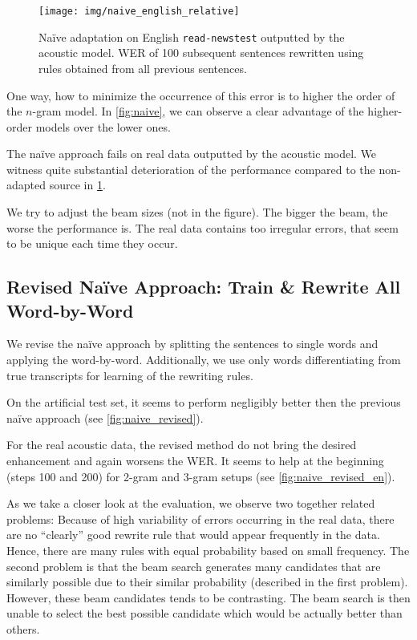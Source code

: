 \begin{figure}[h]
	\texttt{[image: img/naive\_english\_relative]}
	\caption{Na\"ive adaptation on English \texttt{read-newstest} outputted by the acoustic model. WER of 100 subsequent sentences rewritten using rules obtained from all previous sentences.}
	\label{fig:naive_en} 
\end{figure}

One way, how to minimize the occurrence of this error is to higher the order of the $n$-gram model. In \cref{fig:naive}, we can observe a clear advantage of the higher-order models over the lower ones.

The na\"ive approach fails on real data outputted by the acoustic model. We witness quite substantial deterioration of the performance compared to the non-adapted source in \cref{fig:naive_en}. 

We try to adjust the beam sizes (not in the figure). The bigger the beam, the worse the performance is. The real data contains too irregular errors, that seem to be unique each time they occur.

\subsection[Revised Na\"ive Approach: Train \& Rewrite All Word-by-Word]{Revised Na\"ive Approach: Train \& Rewrite All \\Word-by-Word}
We revise the na\"ive approach by splitting the sentences to single words and applying the word-by-word. Additionally, we use only words differentiating from true transcripts for learning of the rewriting rules. 

On the artificial test set, it seems to perform negligibly better then the previous na\"ive approach (see \cref{fig:naive_revised}).

For the real acoustic data, the revised method do not bring the desired enhancement and again worsens the WER. It seems to help at the beginning (steps 100 and 200) for 2-gram and 3-gram setups (see \cref{fig:naive_revised_en}). 

As we take a closer look at the evaluation, we observe two together related problems: Because of high variability of errors occurring in the real data, there are no ``clearly'' good rewrite rule that would appear frequently in the data. Hence, there are many rules with equal probability based on small frequency. The second problem is that the beam search generates many candidates that are similarly possible due to their similar probability (described in the first problem). However, these beam candidates tends to be contrasting. The beam search is then unable to select the best possible candidate which would be actually better than others.

